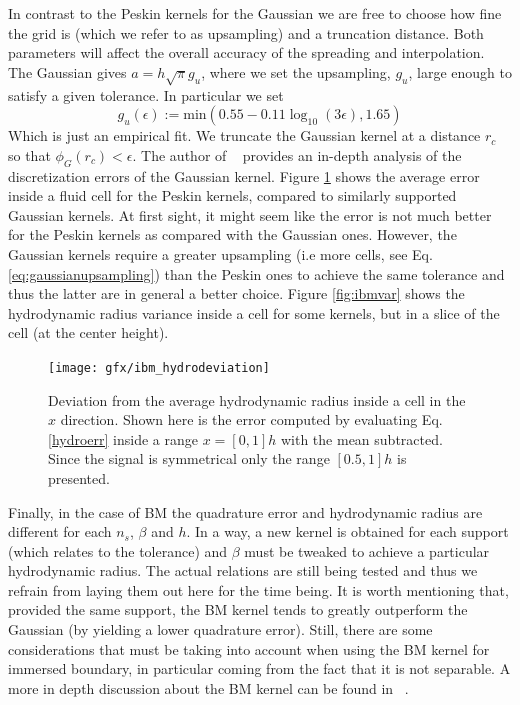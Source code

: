 \documentclass[ twoside,openright,titlepage,numbers=noenddot,%
headinclude,footinclude,cleardoublepage=empty,abstract=on,
BCOR=5mm,paper=b5,fontsize=11pt, dvipsnames
]{scrreprt}
\begin{document}
In contrast to the Peskin kernels for the Gaussian we are free to choose how fine the grid is (which we refer to as upsampling) and a truncation distance. Both parameters will affect the overall accuracy of the spreading and interpolation. The Gaussian gives $a=h \sqrt{\pi} g_u$, where we set the upsampling, $g_u$, large enough to satisfy a given tolerance. In particular we set
\begin{equation}
  \label{eq:gaussianupsampling}
  g_u(\epsilon) := \text{min}\left(0.55 -0.11 \log_{10}(3\epsilon), 1.65\right)
\end{equation}
Which is just an empirical fit.
We truncate the Gaussian kernel at a distance $r_c$ so that $\phi_G(r_c) < \epsilon$. The author of ~\cite{Keaveny2014} provides an in-depth analysis of the discretization errors of the Gaussian kernel.
Figure \ref{fig:ibm_hydrovar} shows the average error inside a fluid cell for the Peskin kernels, compared to similarly supported Gaussian kernels. At first sight, it might seem like the error is not much better for the Peskin kernels as compared with the Gaussian ones. However, the Gaussian kernels require a greater upsampling (i.e more cells, see Eq. \eqref{eq:gaussianupsampling}) than the Peskin ones to achieve the same tolerance and thus the latter are in general a better choice. Figure \ref{fig:ibmvar} shows the hydrodynamic radius variance inside a cell for some kernels, but in a slice of the cell (at the center height).
\begin{figure}[H]
\texttt{[image: gfx/ibm\_hydrodeviation]}
\caption{Deviation from the average hydrodynamic radius inside a cell in the $x$ direction. Shown here is the error computed by evaluating Eq. \eqref{hydroerr} inside a range $x=[0, 1]h$ with the mean subtracted. Since the signal is symmetrical only the range $[0.5, 1]h$ is presented.}
\label{fig:ibm_hydrovar}
\end{figure}
Finally, in the case of BM the quadrature error and hydrodynamic radius are different for each $n_s$, $\beta$ and $h$. In a way, a new kernel is obtained for each support (which relates to the tolerance) and $\beta$ must be tweaked to achieve a particular hydrodynamic radius. The actual relations are still being tested and thus we refrain from laying them out here for the time being. It is worth mentioning that, provided the same support, the BM kernel tends to greatly outperform the Gaussian (by yielding a lower quadrature error). Still, there are some considerations that must be taking into account when using the BM kernel for immersed boundary, in particular coming from the fact that it is not separable. A more in depth discussion about the BM kernel can be found in ~\cite{Barnett2019}.
\end{document}
